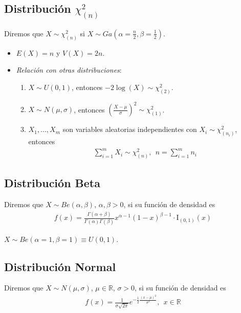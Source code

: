 \subsection{Distribución $\chi_{(n)}^2$}
Diremos que $X \sim \chi_{(n)}^2$ si $X \sim Ga\left( \alpha = \frac{n}{2}, \beta = \frac{1}{2}\right)$.
\begin{itemize}
    \item $E(X) = n$ y $V(X) = 2n$.
    \item \textit{Relación con otras distribuciones}:
          \begin{enumerate}
              \item $X \sim U(0,1)$, entonces $-2\log(X) \sim \chi_{(2)}^2$.
              \item $X \sim N(\mu,\sigma)$, entonces $\left( \frac{X - \mu}{\sigma}\right)^2 \sim \chi_{(1)}^2$.
              \item $X_1,...,X_m$ son variables aleatorias independientes con $X_i \sim \chi_{(n_i)}^2$, entonces
                    \begin{align*}
                        \sum_{i=1}^{m}{X_i} \sim \chi_{(n)}^2, \ \ n = \sum_{i=1}^{m}{n_i}
                    \end{align*}
          \end{enumerate}
\end{itemize}

\subsection{Distribución Beta}
Diremos que $X \sim Be(\alpha, \beta)$, $\alpha,\beta >0$, si su función de densidad es
\begin{align*}
    f(x) = \frac{\Gamma(\alpha + \beta)}{\Gamma(\alpha)\Gamma(\beta)}x^{\alpha -1}(1-x)^{\beta -1} \cdot \text{I}_{(0,1)}(x)
\end{align*}
\begin{obs}
    $X \sim Be(\alpha = 1, \beta = 1) \equiv U(0,1)$.
\end{obs}

\subsection{Distribución Normal}
Diremos que $X \sim N(\mu, \sigma)$, $\mu \in \mathbb{R}$, $\sigma >0$, si su función de densidad es
\begin{align*}
    f(x) = \frac{1}{\sigma\sqrt{2\pi}}e^{-\frac{1}{2} \frac{(x -\mu)^2}{\sigma^2}}, \ \ x \in \mathbb{R}
\end{align*}

